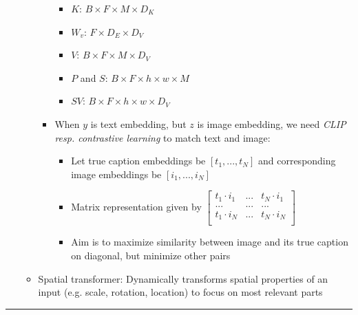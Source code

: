 \begin{itemize}
\begin{itemize}
\begin{itemize}
\begin{itemize}
                \item $K$: $B \times F \times M \times D_K$
                \item $W_v$: $F \times D_E \times D_V$
                \item $V$: $B \times F \times M \times D_V$
                \item $P$ and $S$: $B \times F \times h \times w \times M$
                \item $SV$: $B \times F \times h \times w \times D_V$
            \end{itemize}
            \item When $y$ is text embedding, but $z$ is image embedding, we need \emph{CLIP resp. contrastive learning} to match text and image:
            \begin{itemize}
                \item Let true caption embeddings be $[t_1, ..., t_N]$ and corresponding image embeddings be $[i_1, ..., i_N]$
                \item Matrix representation given by
                $
                \begin{bmatrix}
                t_1 \cdot i_1 & ... & t_N \cdot i_1\\
                ... & ... & ...\\
                t_1 \cdot i_N & ... & t_N \cdot i_N\\
                \end{bmatrix}
                $
                \item Aim is to maximize similarity between image and its true caption on diagonal, but minimize other pairs
            \end{itemize}
        \end{itemize}
        \item Spatial transformer: Dynamically transforms spatial properties of an input (e.g. scale, rotation, location) to focus on most relevant parts
    \end{itemize}
\end{itemize}

{\color{lightgray}\hrule height 0.001mm}

